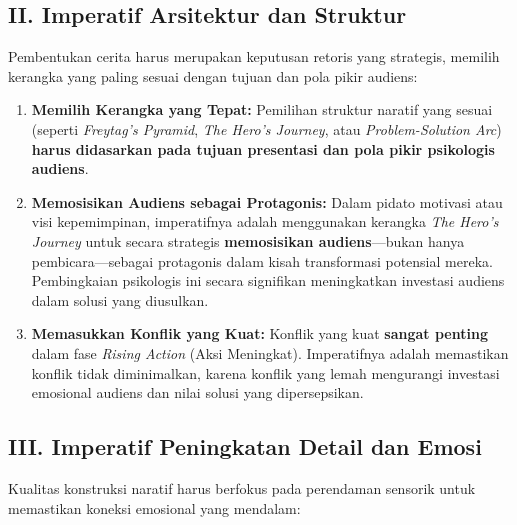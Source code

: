 \documentclass[
  letterpaper,
  DIV=11,
  numbers=noendperiod]{scrreprt}
\providecommand{\tightlist}{%
  \setlength{\itemsep}{0pt}\setlength{\parskip}{0pt}}
\begin{document}
\subsection{II. Imperatif Arsitektur dan
Struktur}\label{ii.-imperatif-arsitektur-dan-struktur}

Pembentukan cerita harus merupakan keputusan retoris yang strategis,
memilih kerangka yang paling sesuai dengan tujuan dan pola pikir
audiens:

\begin{enumerate}
\def\labelenumi{\arabic{enumi}.}
\tightlist
\item
  \textbf{Memilih Kerangka yang Tepat:} Pemilihan struktur naratif yang
  sesuai (seperti \emph{Freytag's Pyramid}, \emph{The Hero's Journey},
  atau \emph{Problem-Solution Arc}) \textbf{harus didasarkan pada tujuan
  presentasi dan pola pikir psikologis audiens}.
\item
  \textbf{Memosisikan Audiens sebagai Protagonis:} Dalam pidato motivasi
  atau visi kepemimpinan, imperatifnya adalah menggunakan kerangka
  \emph{The Hero's Journey} untuk secara strategis \textbf{memosisikan
  audiens}---bukan hanya pembicara---sebagai protagonis dalam kisah
  transformasi potensial mereka. Pembingkaian psikologis ini secara
  signifikan meningkatkan investasi audiens dalam solusi yang diusulkan.
\item
  \textbf{Memasukkan Konflik yang Kuat:} Konflik yang kuat
  \textbf{sangat penting} dalam fase \emph{Rising Action} (Aksi
  Meningkat). Imperatifnya adalah memastikan konflik tidak diminimalkan,
  karena konflik yang lemah mengurangi investasi emosional audiens dan
  nilai solusi yang dipersepsikan.
\end{enumerate}

\subsection{III. Imperatif Peningkatan Detail dan
Emosi}\label{iii.-imperatif-peningkatan-detail-dan-emosi}

Kualitas konstruksi naratif harus berfokus pada perendaman sensorik
untuk memastikan koneksi emosional yang mendalam:
\end{document}
